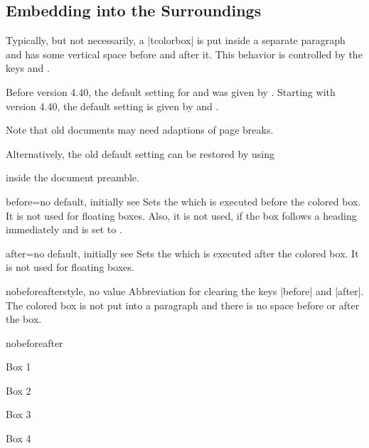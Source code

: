 \clearpage
\subsection{Embedding into the Surroundings}\label{subsec:surroundings}
Typically, but not necessarily, a |tcolorbox| is put inside a separate paragraph
and has some vertical space before and after it.
This behavior is controlled by the keys  and .

\begin{marker}
Before version 4.40, the default setting for 
and  was given by .
Starting with version 4.40, the default setting is given by
 and .\par
Note that old documents may need adaptions of page breaks.\par
Alternatively, the old default setting can be restored by using
\begin{dispListing}
\end{dispListing}
inside the document preamble.
\end{marker}


\begin{docTcbKey}{before}{=}{no default, initially see }
  Sets the  which is executed before the colored box.
  It is not used for floating boxes.
  Also, it is not used, if the box follows a heading immediately
  and  is set to .
\end{docTcbKey}

\begin{docTcbKey}{after}{=}{no default, initially see }
  Sets the  which is executed after the colored box.
  It is not used for floating boxes.
\end{docTcbKey}


\begin{docTcbKey}{nobeforeafter}{}{style, no value}
  Abbreviation for clearing the keys |before| and |after|. The colored box
  is not put into a paragraph and there is no space before or after the box.
\begin{exdispExample}{nobeforeafter}
\begin{tcolorbox}[myone,title=Box 1]Box 1\end{tcolorbox}%
\begin{tcolorbox}[myone,title=Box 2]Box 2\end{tcolorbox}%
\begin{tcolorbox}[myone,title=Box 3]Box 3\end{tcolorbox}%
\begin{tcolorbox}[myone,title=Box 4]Box 4\end{tcolorbox}
\end{exdispExample}
\end{docTcbKey}

